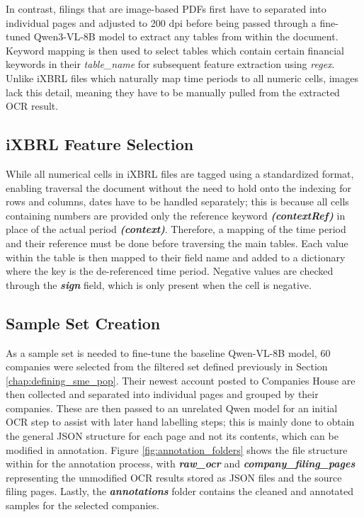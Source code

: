 \documentclass[ %
                    author={Natchalin Iwsakul \\ Inkaphol Siriwongwattana \\ Tanaphan Kummaraphat \\ Patorn Srisupap},
                supervisor={Fernando Moreno-Pino},
                    degree={MSc},
                     title={Propensity Modelling for SME Commercial Lending Using Open Public Data},
                  subtitle={Companies House filings and GDELT media coverage as predictors of first-time borrowing},
                      type={},
                      year={2026}]{dissertation}
\begin{document}
  In contrast, filings that are image-based PDFs first have to separated into individual pages and adjusted to 200 dpi before being passed through a fine-tuned Qwen3-VL-8B model to extract any tables from within the document. Keyword mapping is then used to select tables which contain certain financial keywords in their \textit{table\_name} for subsequent feature extraction using \textit{regex}. Unlike iXBRL files which naturally map time periods to all numeric cells, images lack this detail, meaning they have to be manually pulled from the extracted OCR result.

\subsection{iXBRL Feature Selection}
  While all numerical cells in iXBRL files are tagged using a standardized format, enabling traversal the document without the need to hold onto the indexing for rows and columns, dates have to be handled separately; this is because all cells containing numbers are provided only the reference keyword \textbf{\textit{(contextRef)}} in place of the actual period \textbf{\textit{(context)}}. Therefore, a mapping of the time period and their reference must be done before traversing the main tables. Each value within the table is then mapped to their field name and added to a dictionary where the key is the de-referenced time period. Negative values are checked through the \textbf{\textit{sign}} field, which is only present when the cell is negative. 

\subsection{Sample Set Creation}
  As a sample set is needed to fine-tune the baseline Qwen-VL-8B model, 60 companies were selected from the filtered set defined previously in Section \ref{chap:defining_sme_pop}. Their newest account posted to Companies House are then collected and separated into individual pages and grouped by their companies. These are then passed to an unrelated Qwen model for an initial OCR step to assist with later hand labelling steps; this is mainly done to obtain the general JSON structure for each page and not its contents, which can be modified in annotation. Figure \ref{fig:annotation_folders} shows the file structure within for the annotation process, with \textbf{\textit{raw\_ocr}} and \textbf{\textit{company\_filing\_pages}} representing the unmodified OCR results stored as JSON files and the source filing pages. Lastly, the \textbf{\textit{annotations}} folder contains the cleaned and annotated samples for the selected companies.
\end{document}
